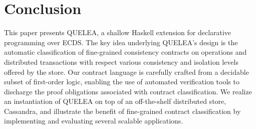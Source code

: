 \section{Conclusion}
\label{sec:conclusion}

This paper presents QUELEA, a shallow Haskell extension for declarative
programming over ECDS. The key idea underlying QUELEA’s design is the
automatic classification of fine-grained consistency contracts on
operations and distributed transactions with respect various consistency
and isolation levels offered by the store. Our contract language is
carefully crafted from a decidable subset of first-order logic, enabling
the use of automated verification tools to discharge the proof
obligations associated with contract classification. We realize an
instantiation of QUELEA on top of an off-the-shelf distributed store,
Cassandra, and illustrate the benefit of fine-grained contract
classification by implementing and evaluating several scalable
applications.
